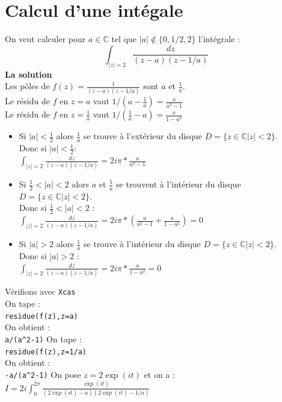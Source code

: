 \documentclass[a4paper,11pt]{book}
\newcommand{\C}{{\mathbb{C}}}
\begin{document}
\section{Calcul d'une int\'egale} 
On veut calculer pour $a\in \C$ tel que $|a|\notin \{0,1/2,2\}$ l'int\'egrale :
 $$\int_{|z|=2}\frac{dz}{(z-a)(z-1/a)}$$
{\bf La solution}\\
Les p\^oles de $\displaystyle f(z)=\frac{1}{(z-a)(z-1/a)}$ sont $a$ et $\displaystyle\frac{1}{a}$.\\
Le r\'esidu de $f$ en $z=a$ vaut $\displaystyle 1/(a-\frac{1}{a})=\frac{a}{a^2-1}$\\
Le r\'esidu de $f$ en $\displaystyle z=\frac{1}{a}$ vaut $\displaystyle 1/(\frac{1}{a}-a)=\frac{a}{1-a^2}$
\begin{itemize}
\item Si $\displaystyle |a|<\frac{1}{2}$ alors $\displaystyle\frac{1}{a}$ se trouve \`a l'ext\'erieur du disque 
$D=\{z\in \C |z|<2\}$.\\ 
Donc si $\displaystyle |a|<\frac{1}{2}$:\\
$\displaystyle\int_{|z|=2}\frac{dz}{(z-a)(z-1/a)}=2i\pi*\frac{a}{a^2-1}$
\item Si $\displaystyle \frac{1}{2}<|a|<2$ alors $a$ et 
$\displaystyle \frac{1}{a}$ se trouvent \`a l'int\'erieur du disque $D=\{z\in \C |z|<2\}$.\\
Donc si $\displaystyle\frac{1}{2}<|a|<2$ :\\
$\displaystyle\int_{|z|=2}\frac{dz}{(z-a)(z-1/a)}=2i\pi*(\frac{a}{a^2-1}+\frac{a}{1-a^2})=0$
\item Si $|a|>2$ alors $\displaystyle\frac{1}{a}$ se trouve \`a l'int\'erieur du disque 
$D=\{z\in \C |z|<2\}$.\\
Donc si $|a|>2$ :\\
$\displaystyle\int_{|z|=2}\frac{dz}{(z-a)(z-1/a)}=2i\pi*\frac{a}{1-a^2}=0$
\end{itemize}
V\'erifions avec {\tt Xcas}\\
On tape :\\
{\tt residue(f(z),z=a)}\\
On obtient :\\
{\tt a/(a\verb|^|2-1)}
On tape :\\
{\tt residue(f(z),z=1/a)}\\
On obtient :\\
{\tt -a/(a\verb|^|2-1)}
On pose $z=2\exp(it)$ et on a :\\
$\displaystyle I=2i\int_0^{2\pi}\frac{\exp(it)}{(2\exp(it)-a)(2\exp(it)-1/a)}$\\
\end{document}
